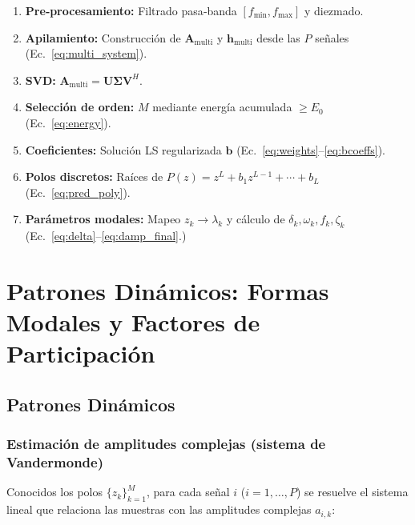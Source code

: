 \begin{enumerate}
    \item \textbf{Pre‑procesamiento:} Filtrado pasa‑banda $[f_{\min}, f_{\max}]$ y diezmado.
    \item \textbf{Apilamiento:} Construcción de $\mathbf{A}_{\text{multi}}$ y $\mathbf{h}_{\text{multi}}$
          desde las $P$ señales (Ec.~\ref{eq:multi_system}).
    \item \textbf{SVD:} $\mathbf{A}_{\text{multi}} = \mathbf{U}\boldsymbol{\Sigma}\mathbf{V}^H$.
    \item \textbf{Selección de orden:} $M$ mediante energía acumulada $\ge E_0$ (Ec.~\ref{eq:energy}).
    \item \textbf{Coeficientes:} Solución LS regularizada $\mathbf{b}$ (Ec.~\ref{eq:weights}--\ref{eq:bcoeffs}).
    \item \textbf{Polos discretos:} Raíces de $P(z) = z^L + b_1 z^{L-1} + \cdots + b_L$ (Ec.~\ref{eq:pred_poly}).
    \item \textbf{Parámetros modales:} Mapeo $z_k \to \lambda_k$ y cálculo de $\delta_k, \omega_k, f_k, \zeta_k$
          (Ec.~\ref{eq:delta}--\ref{eq:damp_final}.)
\end{enumerate}

%


\section{Patrones Dinámicos: Formas Modales y Factores de Participación}

\subsection{Patrones Dinámicos}
\subsubsection{Estimación de amplitudes complejas (sistema de Vandermonde)}

Conocidos los polos  $\{z_k\}_{k=1}^{M}$, para cada señal $i$ ($i=1,\dots,P$)
se resuelve el sistema lineal que relaciona las muestras con las amplitudes complejas
$a_{i,k}$:

